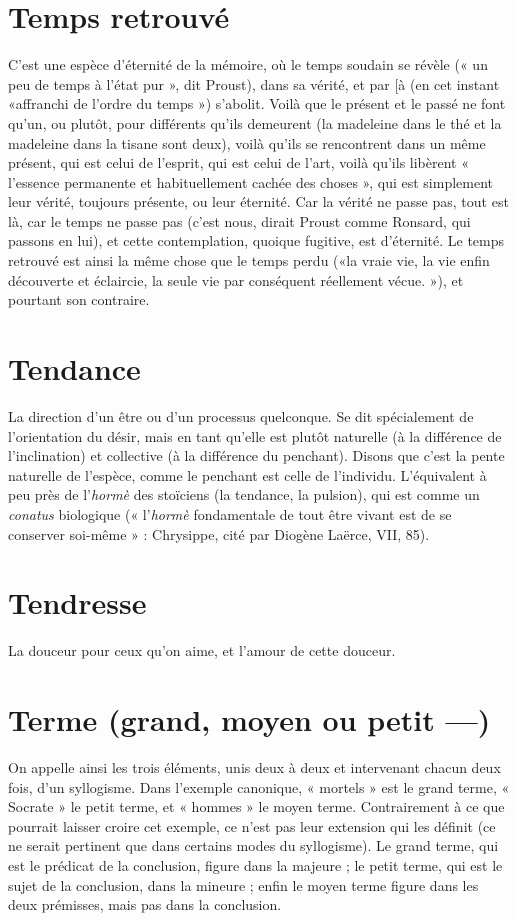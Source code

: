 \section{Temps retrouvé}
C’est une espèce d’éternité de la mémoire, où le temps
soudain se révèle (« un peu de temps à l’état pur », dit
Proust), dans sa vérité, et par [à (en cet instant «affranchi de l’ordre du
temps ») s’abolit. Voilà que le présent et le passé ne font qu’un, ou plutôt, pour
différents qu’ils demeurent (la madeleine dans le thé et la madeleine dans la
tisane sont deux), voilà qu’ils se rencontrent dans un même présent, qui est
celui de l'esprit, qui est celui de l’art, voilà qu’ils libèrent « l’essence permanente
et habituellement cachée des choses », qui est simplement leur vérité, toujours
présente, ou leur éternité. Car la vérité ne passe pas, tout est là, car le temps ne
passe pas (c’est nous, dirait Proust comme Ronsard, qui passons en lui), et cette
contemplation, quoique fugitive, est d’éternité. Le temps retrouvé est ainsi la
même chose que le temps perdu («la vraie vie, la vie enfin découverte et
éclaircie, la seule vie par conséquent réellement vécue. »), et pourtant son
contraire.

\section{Tendance}
La direction d’un être ou d’un processus quelconque. Se dit
spécialement de l'orientation du désir, mais en tant qu’elle est
plutôt naturelle (à la différence de l’inclination) et collective (à la différence du
penchant). Disons que c’est la pente naturelle de l’espèce, comme le penchant
est celle de l’individu. L’équivalent à peu près de l’{\it hormè} des stoïciens (la tendance,
la pulsion), qui est comme un {\it conatus} biologique (« l’{\it hormè} fondamentale
de tout être vivant est de se conserver soi-même » : Chrysippe, cité par
Diogène Laërce, VII, 85).

\section{Tendresse}
La douceur pour ceux qu’on aime, et l’amour de cette douceur.

\section{Terme (grand, moyen ou petit —)}
On appelle ainsi les trois éléments,
unis deux à deux et
intervenant chacun deux fois, d’un syllogisme. Dans l’exemple canonique,
« mortels » est le grand terme, « Socrate » le petit terme, et « hommes » le moyen
terme. Contrairement à ce que pourrait laisser croire cet exemple, ce n’est pas leur
extension qui les définit (ce ne serait pertinent que dans certains modes du syllogisme).
Le grand terme, qui est le prédicat de la conclusion, figure dans la
majeure ; le petit terme, qui est le sujet de la conclusion, dans la mineure ; enfin
le moyen terme figure dans les deux prémisses, mais pas dans la conclusion.

